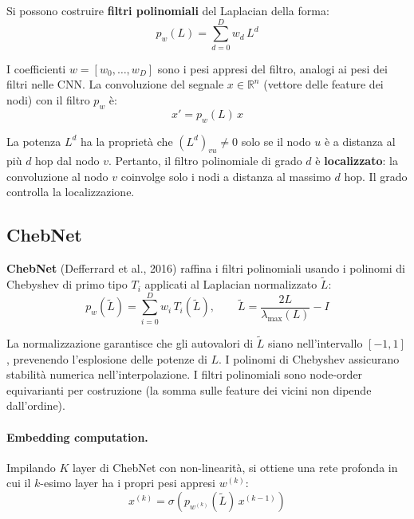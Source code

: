 Si possono costruire \textbf{filtri polinomiali} del Laplacian della
forma:
\begin{equation}
  p_w(L) = \sum_{d=0}^{D} w_d\, L^d
  \label{eq:poly-filter}
\end{equation}

I coefficienti $w = [w_0, \ldots, w_D]$ sono i pesi appresi del
filtro, analogi ai pesi dei filtri nelle CNN. La convoluzione del
segnale $x \in \mathbb{R}^n$ (vettore delle feature dei nodi) con
il filtro $p_w$ è:
\begin{equation}
  x' = p_w(L)\, x
  \label{eq:poly-conv}
\end{equation}

La potenza $L^d$ ha la proprietà che $(L^d)_{vu} \neq 0$ solo se il
nodo $u$ è a distanza al più $d$ hop dal nodo $v$. Pertanto, il
filtro polinomiale di grado $d$ è \textbf{localizzato}: la
convoluzione al nodo $v$ coinvolge solo i nodi a distanza al massimo
$d$ hop. Il grado controlla la localizzazione.

\subsection{ChebNet}
\label{subsec:chebnet}

\textbf{ChebNet} (Defferrard et al., 2016) raffina i filtri
polinomiali usando i polinomi di Chebyshev di primo tipo $T_i$
applicati al Laplacian normalizzato $\tilde{L}$:
\begin{equation}
  p_w(\tilde{L}) = \sum_{i=0}^{D} w_i\, T_i(\tilde{L}),
  \qquad
  \tilde{L} = \frac{2L}{\lambda_{\max}(L)} - I
  \label{eq:chebnet}
\end{equation}

La normalizzazione garantisce che gli autovalori di $\tilde{L}$ siano
nell'intervallo $[-1, 1]$, prevenendo l'esplosione delle potenze di
$L$. I polinomi di Chebyshev assicurano stabilità numerica
nell'interpolazione. I filtri polinomiali sono node-order equivarianti
per costruzione (la somma sulle feature dei vicini non dipende
dall'ordine).

\paragraph{Embedding computation.} Impilando $K$ layer di ChebNet
con non-linearità, si ottiene una rete profonda in cui il $k$-esimo
layer ha i propri pesi appresi $w^{(k)}$:
\begin{equation}
  x^{(k)} = \sigma\!\left(p_{w^{(k)}}(\tilde{L})\, x^{(k-1)}\right)
  \label{eq:chebnet-stacked}
\end{equation}

